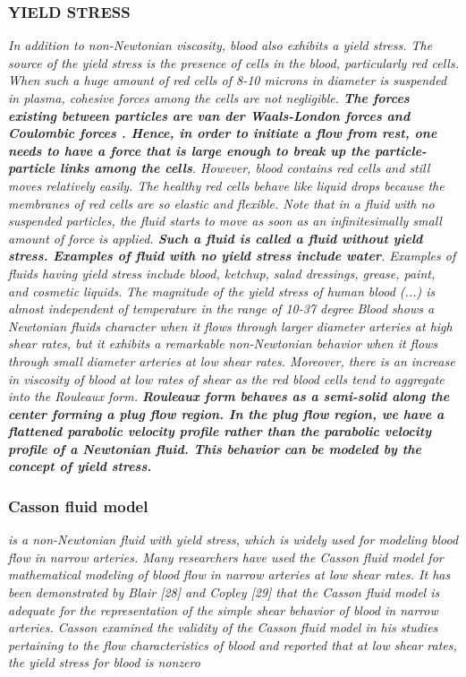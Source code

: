 \documentclass[11pt,letterpaper]{article}
\begin{document}
\subsubsection*{YIELD STRESS} \textit{In addition to non-Newtonian viscosity, blood also exhibits a yield stress. The source
of the yield stress is the presence of cells in the blood, particularly red cells. When such a huge amount of red cells of 8-10 microns in diameter is suspended in plasma, cohesive forces among the cells are not negligible. \textbf{The forces existing between particles are van der Waals-London forces and Coulombic forces . Hence, in order to initiate a flow from rest, one needs to have a force that is large enough to break up the particle-particle links among the cells}. However, blood contains red cells and still moves relatively easily. The healthy red cells behave like liquid drops because the membranes of red cells are so elastic and flexible. Note that in a fluid with no suspended particles, the fluid starts to move as soon as an infinitesimally small amount of force is applied. \textbf{Such a fluid is called a fluid without yield stress. Examples of fluid with no yield stress include water}. Examples of fluids having yield stress include blood, ketchup, salad dressings, grease, paint, and cosmetic liquids.} \newline\newline
\textit{The magnitude of the yield stress of human blood (...) is almost independent of temperature in the range of 10-37 degree} \newline\newline
\textit{Blood shows a Newtonian fluids character when it flows through larger diameter arteries at high shear rates, but it exhibits a remarkable non-Newtonian behavior when it flows through small diameter arteries at low shear rates. Moreover, there is an increase in viscosity of blood at low rates of shear as the red blood cells tend to aggregate into the Rouleaux form. \textbf{Rouleaux form behaves as a semi-solid along the center forming a plug flow region. In the plug flow region, we have a flattened parabolic velocity profile rather than the parabolic velocity profile of a Newtonian fluid. This behavior can be modeled by the concept of yield stress.} } 



\subsubsection*{\color{red}Casson fluid model} \textit{is a non-Newtonian fluid with yield stress, which is widely used for modeling blood flow in narrow arteries. Many researchers have used the Casson fluid model for mathematical modeling of blood flow in narrow arteries at low shear rates. It has been demonstrated by Blair [28] and Copley [29] that the Casson fluid model is adequate for the representation of the simple shear behavior of blood in narrow arteries. Casson examined the validity of the Casson fluid model in his studies pertaining to the flow characteristics of blood and reported that at low shear rates, the yield stress for blood is nonzero}
\end{document}
